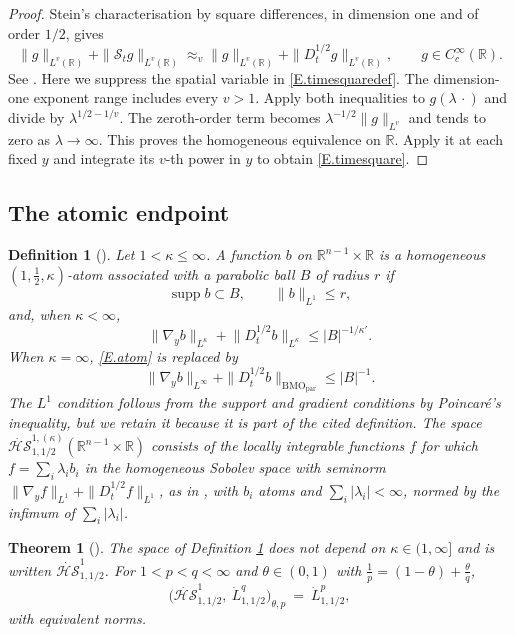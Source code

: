 \documentclass[10pt,a4paper]{amsart}
\numberwithin{equation}{section}
\DeclareMathOperator{\supp}{supp}
\newcommand{\R}{\mathbb R}
\newcommand{\abs}[1]{\left\vert#1\right\vert}
\newcommand{\dhalf}{D_t^{1/2}}
\newcommand{\BMOpar}{\mathrm{BMO}_{\mathrm{par}}}
\newcommand{\HS}{\dot{\mathcal{HS}}^{1}_{1,1/2}}
\newtheorem{theorem}[equation]{Theorem}
\newtheorem{definition}[equation]{Definition}
\begin{document}
\begin{proof}
Stein's characterisation by square differences, in dimension one and
of order $1/2$, gives
\[
 \|g\|_{L^v(\R)}+\|\mathcal S_t g\|_{L^v(\R)}
 \approx_v \|g\|_{L^v(\R)}+\|\dhalf g\|_{L^v(\R)},
 \qquad g\in C_c^\infty(\R).
\]
See \cite[Theorem B, (1.7)]{BJM}. Here we suppress the spatial variable
in \eqref{E.timesquaredef}. The dimension-one exponent range includes
every $v>1$. Apply both inequalities to $g(\lambda\,\cdot)$ and divide
by $\lambda^{1/2-1/v}$. The zeroth-order term becomes
$\lambda^{-1/2}\|g\|_{L^v}$ and tends to zero as $\lambda\to\infty$.
This proves the homogeneous equivalence on $\R$. Apply it at each fixed
$y$ and integrate its $v$-th power in $y$ to obtain \eqref{E.timesquare}.
\end{proof}

\subsection{The atomic endpoint}\label{ss.atoms}

\begin{definition}[{\cite[Definition 6.1]{DN}}]\label{D.atom}
Let $1<\kappa\le\infty$. A function $b$ on $\R^{n-1}\times\R$ is a homogeneous
$(1,\tfrac12,\kappa)$-atom associated with a parabolic ball $B$ of radius $r$ if
\[
  \supp b\subset B,\qquad \|b\|_{L^1}\le r,
\]
and, when $\kappa<\infty$,
\begin{equation}\label{E.atom}
  \|\nabla_yb\|_{L^\kappa}+\big\|\dhalf b\big\|_{L^\kappa}\le\abs B^{-1/\kappa'} .
\end{equation}
When $\kappa=\infty$, \eqref{E.atom} is replaced by
\[
 \|\nabla_yb\|_{L^\infty}+\|\dhalf b\|_{\BMOpar}\le\abs B^{-1}.
\]
The $L^1$ condition follows from the support and gradient conditions by
Poincar\'e's inequality, but we retain it because it is part of the cited
definition. The space
$\dot{\mathcal{HS}}^{1,(\kappa)}_{1,1/2}(\R^{n-1}\times\R)$ consists of the
locally integrable functions $f$ for which
$f=\sum_i\lambda_ib_i$ in the homogeneous Sobolev space with seminorm
$\|\nabla_y f\|_{L^1}+\|\dhalf f\|_{L^1}$, as in \cite[\S2.2]{DN},
with $b_i$ atoms and $\sum_i\abs{\lambda_i}<\infty$, normed by the infimum of
$\sum_i\abs{\lambda_i}$.
\end{definition}

\begin{theorem}[{\cite[Propositions 6.45 and 6.46]{DN}}]\label{T.interp}
The space of Definition \ref{D.atom} does not depend on $\kappa\in(1,\infty]$ and
is written $\HS$. For $1<p<q<\infty$ and $\theta\in(0,1)$ with
$\frac1p=(1-\theta)+\frac\theta q$,
\begin{equation}\label{E.interp}
  \Big(\HS,\ \dot L^q_{1,1/2}\Big)_{\theta,p}\ =\ \dot L^p_{1,1/2} ,
\end{equation}
with equivalent norms.
\end{theorem}
\end{document}
